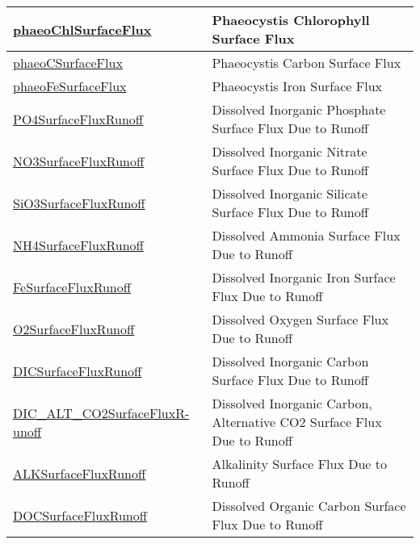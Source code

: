 {\begin{center}
\begin{longtable}{| p{2.0in} | p{4.0in} |}
    \hline
    \hyperref[subsec:var_sec_tracersSurfaceFlux_phaeoChlSurfaceFlux]{phaeoChlSurfaceFlux} & Phaeocystis Chlorophyll Surface Flux \\
    \hline
    \hyperref[subsec:var_sec_tracersSurfaceFlux_phaeoCSurfaceFlux]{phaeoCSurfaceFlux} & Phaeocystis Carbon Surface Flux \\
    \hline
    \hyperref[subsec:var_sec_tracersSurfaceFlux_phaeoFeSurfaceFlux]{phaeoFeSurfaceFlux} & Phaeocystis Iron Surface Flux \\
    \hline
    \hyperref[subsec:var_sec_tracersSurfaceFlux_PO4SurfaceFluxRunoff]{PO4SurfaceFluxRunoff} & Dissolved Inorganic Phosphate Surface Flux Due to Runoff \\
    \hline
    \hyperref[subsec:var_sec_tracersSurfaceFlux_NO3SurfaceFluxRunoff]{NO3SurfaceFluxRunoff} & Dissolved Inorganic Nitrate Surface Flux Due to Runoff \\
    \hline
    \hyperref[subsec:var_sec_tracersSurfaceFlux_SiO3SurfaceFluxRunoff]{SiO3SurfaceFluxRunoff} & Dissolved Inorganic Silicate Surface Flux Due to Runoff \\
    \hline
    \hyperref[subsec:var_sec_tracersSurfaceFlux_NH4SurfaceFluxRunoff]{NH4SurfaceFluxRunoff} & Dissolved Ammonia Surface Flux Due to Runoff \\
    \hline
    \hyperref[subsec:var_sec_tracersSurfaceFlux_FeSurfaceFluxRunoff]{FeSurfaceFluxRunoff} & Dissolved Inorganic Iron Surface Flux Due to Runoff \\
    \hline
    \hyperref[subsec:var_sec_tracersSurfaceFlux_O2SurfaceFluxRunoff]{O2SurfaceFluxRunoff} & Dissolved Oxygen Surface Flux Due to Runoff \\
    \hline
    \hyperref[subsec:var_sec_tracersSurfaceFlux_DICSurfaceFluxRunoff]{DICSurfaceFluxRunoff} & Dissolved Inorganic Carbon Surface Flux Due to Runoff \\
    \hline
    \hyperref[subsec:var_sec_tracersSurfaceFlux_DIC_ALT_CO2SurfaceFluxRunoff]{DIC\_ALT\_CO2SurfaceFluxR-}\hyperref[subsec:var_sec_tracersSurfaceFlux_DIC_ALT_CO2SurfaceFluxRunoff]{unoff}  & Dissolved Inorganic Carbon, Alternative CO2 Surface Flux Due to Runoff \\
    \hline
    \hyperref[subsec:var_sec_tracersSurfaceFlux_ALKSurfaceFluxRunoff]{ALKSurfaceFluxRunoff} & Alkalinity Surface Flux Due to Runoff \\
    \hline
    \hyperref[subsec:var_sec_tracersSurfaceFlux_DOCSurfaceFluxRunoff]{DOCSurfaceFluxRunoff} & Dissolved Organic Carbon Surface Flux Due to Runoff \\

\end{longtable}
\end{center}}
